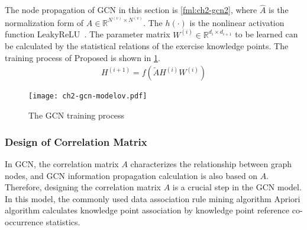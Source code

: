 
The node propagation of GCN in this section is \ref{fml:ch2-gcn2}, where \(\widehat{A}\) is the normalization form of \(A\in \mathbb{R}^{N^{(v)}\times N^{(v)}}\). The \(h(\cdot)\) is the nonlinear activation function LeakyReLU~\cite{maas2013rectifier}. The parameter matrix \(W^{(i)}\in \mathbb{R}^{d_{i}\times d_{i+1}}\) to be learned can be calculated by the statistical relations of the exercise knowledge points. The training process of Proposed is shown in \figurename{\ref{fig:ch2-gcn-explain}}.
\begin{align}
	H^{(i+1)} = f(\tilde{A}H^{(i)}W^{(i)})\label{fml:ch2-gcn2}
\end{align}

\begin{figure}[H]
	\centering
	\texttt{[image: ch2-gcn-modelov.pdf]}
	\caption{The GCN training process}\label{fig:ch2-gcn-explain}
\end{figure}

\subsubsection{Design of Correlation Matrix}


In GCN, the correlation matrix \(A\) characterizes the relationship between graph nodes, and GCN information propagation calculation is also based on \(A\). Therefore, designing the correlation matrix \(A\) is a crucial step in the GCN model. In this model, the commonly used data association rule mining algorithm Apriori algorithm calculates knowledge point association by knowledge point reference co-occurrence statistics.

